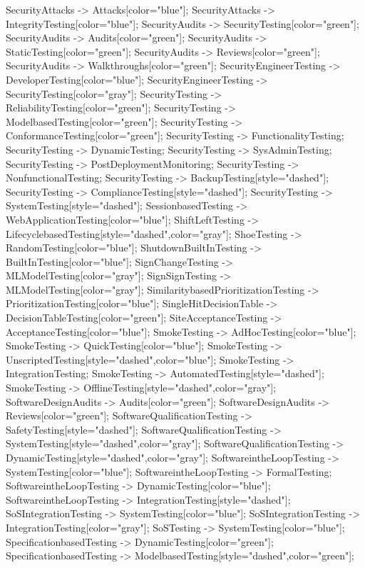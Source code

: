\documentclass{article}
\begin{document}
{SecurityAttacks -> Attacks[color="blue"];
SecurityAttacks -> IntegrityTesting[color="blue"];
SecurityAudits -> SecurityTesting[color="green"];
SecurityAudits -> Audits[color="green"];
SecurityAudits -> StaticTesting[color="green"];
SecurityAudits -> Reviews[color="green"];
SecurityAudits -> Walkthroughs[color="green"];
SecurityEngineerTesting -> DeveloperTesting[color="blue"];
SecurityEngineerTesting -> SecurityTesting[color="gray"];
SecurityTesting -> ReliabilityTesting[color="green"];
SecurityTesting -> ModelbasedTesting[color="green"];
SecurityTesting -> ConformanceTesting[color="green"];
SecurityTesting -> FunctionalityTesting;
SecurityTesting -> DynamicTesting;
SecurityTesting -> SysAdminTesting;
SecurityTesting -> PostDeploymentMonitoring;
SecurityTesting -> NonfunctionalTesting;
SecurityTesting -> BackupTesting[style="dashed"];
SecurityTesting -> ComplianceTesting[style="dashed"];
SecurityTesting -> SystemTesting[style="dashed"];
SessionbasedTesting -> WebApplicationTesting[color="blue"];
ShiftLeftTesting -> LifecyclebasedTesting[style="dashed",color="gray"];
ShoeTesting -> RandomTesting[color="blue"];
ShutdownBuiltInTesting -> BuiltInTesting[color="blue"];
SignChangeTesting -> MLModelTesting[color="gray"];
SignSignTesting -> MLModelTesting[color="gray"];
SimilaritybasedPrioritizationTesting -> PrioritizationTesting[color="blue"];
SingleHitDecisionTable -> DecisionTableTesting[color="green"];
SiteAcceptanceTesting -> AcceptanceTesting[color="blue"];
SmokeTesting -> AdHocTesting[color="blue"];
SmokeTesting -> QuickTesting[color="blue"];
SmokeTesting -> UnscriptedTesting[style="dashed",color="blue"];
SmokeTesting -> IntegrationTesting;
SmokeTesting -> AutomatedTesting[style="dashed"];
SmokeTesting -> OfflineTesting[style="dashed",color="gray"];
SoftwareDesignAudits -> Audits[color="green"];
SoftwareDesignAudits -> Reviews[color="green"];
SoftwareQualificationTesting -> SafetyTesting[style="dashed"];
SoftwareQualificationTesting -> SystemTesting[style="dashed",color="gray"];
SoftwareQualificationTesting -> DynamicTesting[style="dashed",color="gray"];
SoftwareintheLoopTesting -> SystemTesting[color="blue"];
SoftwareintheLoopTesting -> FormalTesting;
SoftwareintheLoopTesting -> DynamicTesting[color="blue"];
SoftwareintheLoopTesting -> IntegrationTesting[style="dashed"];
SoSIntegrationTesting -> SystemTesting[color="blue"];
SoSIntegrationTesting -> IntegrationTesting[color="gray"];
SoSTesting -> SystemTesting[color="blue"];
SpecificationbasedTesting -> DynamicTesting[color="green"];
SpecificationbasedTesting -> ModelbasedTesting[style="dashed",color="green"];
}
\end{document}
